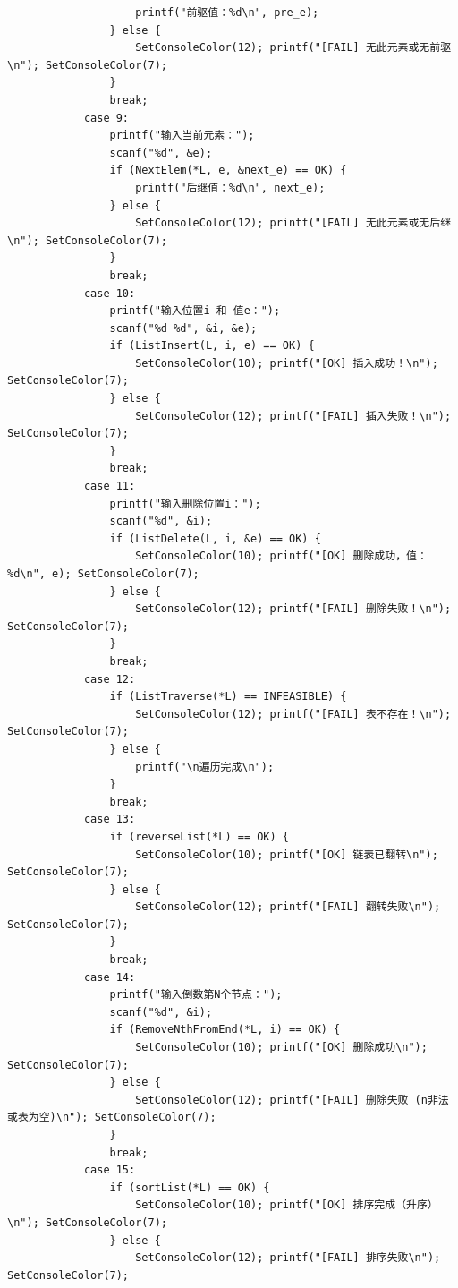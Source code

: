 \documentclass[supercite]{Experimental_Report}
\begin{document}
{\begin{lstlisting}
                    printf("前驱值：%d\n", pre_e);
                } else {
                    SetConsoleColor(12); printf("[FAIL] 无此元素或无前驱\n"); SetConsoleColor(7);
                }
                break;
            case 9:
                printf("输入当前元素：");
                scanf("%d", &e);
                if (NextElem(*L, e, &next_e) == OK) {
                    printf("后继值：%d\n", next_e);
                } else {
                    SetConsoleColor(12); printf("[FAIL] 无此元素或无后继\n"); SetConsoleColor(7);
                }
                break;
            case 10:
                printf("输入位置i 和 值e：");
                scanf("%d %d", &i, &e);
                if (ListInsert(L, i, e) == OK) {
                    SetConsoleColor(10); printf("[OK] 插入成功！\n"); SetConsoleColor(7);
                } else {
                    SetConsoleColor(12); printf("[FAIL] 插入失败！\n"); SetConsoleColor(7);
                }
                break;
            case 11:
                printf("输入删除位置i：");
                scanf("%d", &i);
                if (ListDelete(L, i, &e) == OK) {
                    SetConsoleColor(10); printf("[OK] 删除成功，值：%d\n", e); SetConsoleColor(7);
                } else {
                    SetConsoleColor(12); printf("[FAIL] 删除失败！\n"); SetConsoleColor(7);
                }
                break;
            case 12:
                if (ListTraverse(*L) == INFEASIBLE) {
                    SetConsoleColor(12); printf("[FAIL] 表不存在！\n"); SetConsoleColor(7);
                } else {
                    printf("\n遍历完成\n");
                }
                break;
            case 13:
                if (reverseList(*L) == OK) {
                    SetConsoleColor(10); printf("[OK] 链表已翻转\n"); SetConsoleColor(7);
                } else {
                    SetConsoleColor(12); printf("[FAIL] 翻转失败\n"); SetConsoleColor(7);
                }
                break;
            case 14:
                printf("输入倒数第N个节点：");
                scanf("%d", &i);
                if (RemoveNthFromEnd(*L, i) == OK) {
                    SetConsoleColor(10); printf("[OK] 删除成功\n"); SetConsoleColor(7);
                } else {
                    SetConsoleColor(12); printf("[FAIL] 删除失败 (n非法或表为空)\n"); SetConsoleColor(7);
                }
                break;
            case 15:
                if (sortList(*L) == OK) {
                    SetConsoleColor(10); printf("[OK] 排序完成（升序）\n"); SetConsoleColor(7);
                } else {
                    SetConsoleColor(12); printf("[FAIL] 排序失败\n"); SetConsoleColor(7);

\end{lstlisting}}
\end{document}
